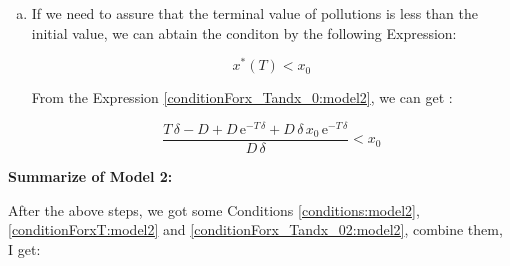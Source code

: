 \begin{enumerate}[a)]


    Since the function $x^*(t)$ is concave for $t\in[0,T]$. To assure $x^*(t)\geq 0$ for all $t\in [0,T]$. We only need to make sure the boundary points large than $0$, w.r.t $x_0\geq 0\ \text{and}\ x^*(T)\geq 0$.

    Substitute $t=T$ into Equation \eqref{eq2:optx}, we can get the terminal value of $x^*$ w.r.t $x^*(T)$:

    \begin{equation}
        x^*(T)=\frac{T\,\delta -D+D\,{\mathrm{e}}^{-T\,\delta }+D\,\delta \,x_{0}\,{\mathrm{e}}^{-T\,\delta }}{D\,\delta }
    \end{equation}

    Obviously, $D\delta>0$, so we need add the condition:

    \begin{equation}\label{conditionForxT:model2}
        T\,\delta -D+D\,{\mathrm{e}}^{-T\,\delta }+D\,\delta \,x_{0}\,{\mathrm{e}}^{-T\,\delta }\geq 0
    \end{equation}

    \item If we need to assure that the terminal value of pollutions is less than the initial value, we can abtain the conditon by the following Expression:
    
    \begin{equation}\label{conditionForx_Tandx_0:model2}
        x^*(T)<x_0
    \end{equation}

    From the Expression \eqref{conditionForx_Tandx_0:model2}, we can get :

    \begin{equation}\label{conditionForx_Tandx_02:model2}
        \frac{T\,\delta -D+D\,{\mathrm{e}}^{-T\,\delta }+D\,\delta \,x_{0}\,{\mathrm{e}}^{-T\,\delta }}{D\,\delta }<x_0
    \end{equation}

\end{enumerate}

{\bf Summarize of Model 2:}

After the above steps, we got some Conditions \eqref{conditions:model2}, \eqref{conditionForxT:model2} and \eqref{conditionForx_Tandx_02:model2}, combine them, I get:

